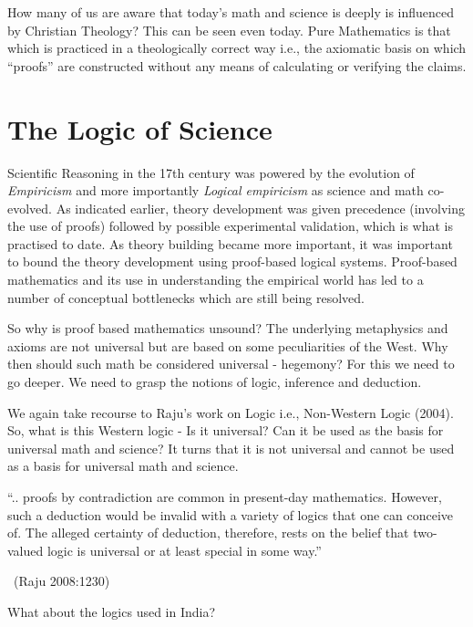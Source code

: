 How many of us are aware that today’s math and science is deeply is influenced by Christian Theology? This can be seen even today. Pure Mathematics is that which is practiced in a theologically correct way i.e., the axiomatic basis on which “proofs” are constructed without any means of calculating or verifying the claims.


\section*{The Logic of Science}

Scientific Reasoning in the 17th century was powered by the evolution of \textit{Empiricism} and more importantly \textit{Logical empiricism} as science and math co-evolved. As indicated earlier, theory development was given precedence (involving the use of proofs) followed by possible experimental validation, which is what is practised to date. As theory building became more important, it was important to bound the theory development using proof-based logical systems. Proof-based mathematics and its use in understanding the empirical world has led to a number of conceptual bottlenecks which are still being resolved.

So why is proof based mathematics unsound? The underlying metaphysics and axioms are not universal but are based on some peculiarities of the West. Why then should such math be considered universal - hegemony? For this we need to go deeper. We need to grasp the notions of logic, inference and deduction.

We again take recourse to Raju’s work on Logic i.e., Non-Western Logic (2004). So, what is this Western logic - Is it universal? Can it be used as the basis for universal math and science? It turns that it is not universal and cannot be used as a basis for universal math and science.

\begin{myquote}
“.. proofs by contradiction are common in present-day mathematics. However, such a deduction would be invalid with a variety of logics that one can conceive of. The alleged certainty of deduction, therefore, rests on the belief that two-valued logic is universal or at least special in some way.” 

\vskip -5pt

~\hfill (Raju 2008:1230)
\end{myquote}

What about the logics used in India?

